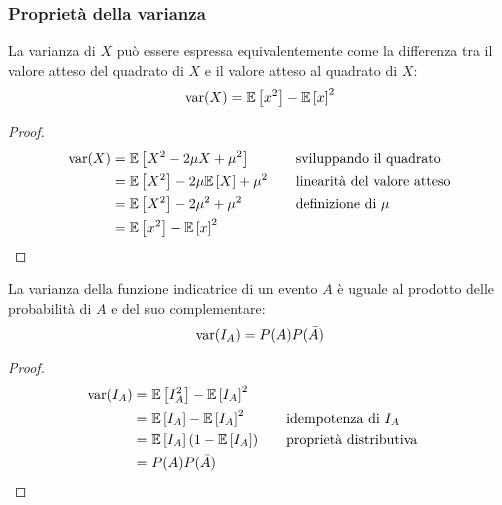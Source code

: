 \subsubsection{Proprietà della varianza}
\begin{prop} \label{prop:varalt}
	La varianza di $X$ può essere espressa equivalentemente come la differenza tra il valore atteso del quadrato di $X$ e il valore atteso al quadrato di $X$:
	\begin{equation} \label{eq:varalt}
		\operatorname{var}(X) = \mathbb{E}\left[ x^2 \right]- \mathbb{E}\left[ x \right]^2
	\end{equation}
\end{prop}
\begin{proof}
	\begin{align*}
		\operatorname{var}(X) & = \mathbb{E}\left[ X^2-2\mu X+\mu^2 \right]         & \quad & \text{sviluppando il quadrato}     \\
		        & = \mathbb{E}\left[ X^2 \right]-2\mu \mathbb{E}\left[ X \right]+\mu^2    & \quad & \text{linearità del valore atteso} \\
		        & = \mathbb{E}\left[ X^2 \right]-2\mu^2+\mu^2         & \quad & \text{definizione di $\mu$}        \\
		        & = \mathbb{E}\left[ x^2 \right]- \mathbb{E}\left[ x \right]^2
	\end{align*}
\end{proof}

\begin{prop} \label{prop:indvar}
	La varianza della funzione indicatrice di un evento $A$ è uguale al prodotto delle probabilità di $A$ e del suo complementare:
	\begin{equation*}
		\operatorname{var}(I_A) = P(A)P(\bar A)
	\end{equation*}
\end{prop}
\begin{proof}
	\begin{align*}
		\operatorname{var}(I_A) & = \mathbb{E}\left[ I_A^2 \right]- \mathbb{E}\left[ I_A \right]^2                             \\
		          & = \mathbb{E}\left[ I_A \right]- \mathbb{E}\left[ I_A \right]^2   & \quad & \text{idempotenza di $I_A$}   \\
		          & = \mathbb{E}\left[ I_A \right](1- \mathbb{E}\left[ I_A \right])  & \quad & \text{proprietà distributiva} \\
		          & = P(A)P(\bar A)
	\end{align*}
\end{proof}

